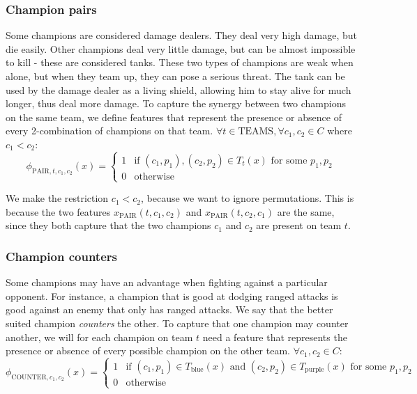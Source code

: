 \subsubsection{Champion pairs}
Some champions are considered damage dealers. They deal very high damage, but die easily. Other champions deal very little damage, but can be almost impossible to kill - these are considered tanks. These two types of champions are weak when alone, but when they team up, they can pose a serious threat. The tank can be used by the damage dealer as a living shield, allowing him to stay alive for much longer, thus deal more damage.
To capture the synergy between two champions on the same team, we define features that represent the presence or absence of every 2-combination of champions on that team. $\forall t \in \text{TEAMS}, \forall c_1, c_2 \in C$ where $c_1 < c_2$:
\begin{equation}\label{eq:pair}
\phi_{\text{PAIR}, t, c_1, c_2}(x) =
\begin{cases}
  1 & \text{if } (c_1, p_1), (c_2, p_2) \in T_t(x) \text{ for some }p_1, p_2\\
  0 & \text{otherwise}
\end{cases}
\end{equation}

We make the restriction $c_1 < c_2$, because we want to ignore permutations. This is because the two features $x_\text{PAIR}(t, c_1, c_2)$ and $x_\text{PAIR}(t, c_2, c_1)$ are the same, since they both capture that the two champions $c_1$ and $c_2$ are present on team $t$.

\subsubsection{Champion counters}
Some champions may have an advantage when fighting against a particular opponent.
For instance, a champion that is good at dodging ranged attacks is good against an enemy that only has ranged attacks.
We say that the better suited champion \emph{counters} the other.
To capture that one champion may counter another, we will for each champion on team $t$ need a feature that represents the presence or absence of every possible champion on the other team. $\forall c_1, c_2 \in C:$
\begin{equation}\label{eq:counter}
\phi_{\text{COUNTER},c_1,c_2}(x) = 
\begin{cases} 
1 & \text{if } (c_1, p_1) \in T_\text{blue}(x) \text{ and } (c_2, p_2) \in T_\text{purple}(x) \text{ for some } p_1, p_2 \\ 
0 & \text{otherwise} 
\end{cases}
\end{equation}

